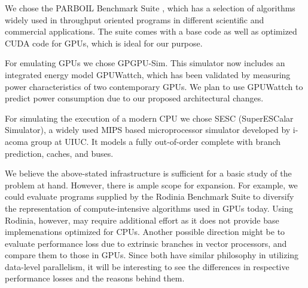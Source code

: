 \par{
We chose the PARBOIL Benchmark Suite \cite{parboil-benchmark-suite}, which has a selection of algorithms widely used in throughput oriented programs in different scientific and commercial applications. The suite comes with a base code as well as optimized CUDA code for GPUs, which is ideal for our purpose.
}

\par{
For emulating GPUs we chose GPGPU-Sim\cite{gpgpu-sim}. This simulator now includes an integrated energy model GPUWattch, which has been validated by measuring power characteristics of two contemporary GPUs. We plan to use GPUWattch to predict power consumption due to our proposed architectural changes.
}

\par{
For simulating the execution of a modern CPU we chose SESC\cite{sesc-simulator} (SuperESCalar Simulator), a widely used MIPS based microprocessor simulator developed by i-acoma group at UIUC. It models a fully out-of-order complete with branch prediction, caches, and buses.
}

\par{We believe the above-stated infrastructure is sufficient for a basic study of the problem at hand. However, there is ample scope for expansion. For example, we could evaluate programs supplied by the Rodinia Benchmark Suite\cite{rodinia-benchmark-suite} to diversify the representation of compute-intensive algorithms used in GPUs today. Using Rodinia, however, may require additional effort as it does not provide base implemenations optimized for CPUs. Another possible direction might be to evaluate performance loss due to extrinsic branches in vector processors, and compare them to those in GPUs. Since both have similar philosophy in utilizing data-level parallelism, it will be interesting to see the differences in respective performance losses and the reasons behind them.}
